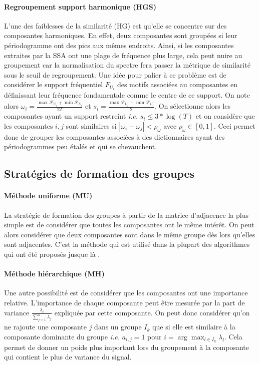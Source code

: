 \documentclass{gretsi}
\newcommand{\inter}{\left[0, 1\right]}
\begin{document}
\paragraph{Regroupement support harmonique (HGS)}\label{par:HGS}
    L'une des faiblesses de la similarité (HG) est qu'elle se concentre sur des composantes harmoniques. 
    En effet, deux composantes sont groupées si leur périodogramme ont des pics aux mêmes endroits.
    Ainsi, si les composantes extraites par la SSA ont une plage de fréquence plus large, cela peut nuire au groupement car la normalisation du spectre fera passer la métrique de similarité sous le seuil de regroupement.
    Une idée pour palier à ce problème est de considérer le support fréquentiel $F_{U_i}$ des motifs associées au composantes en définissant leur fréquence fondamentale comme le centre de ce support.
    On note alors $\omega_i = \frac{\displaystyle\max \mathcal F_{U_i} + \min \mathcal F_{U_i} }{2 T}$ et $s_i = \frac{\displaystyle\max \mathcal F_{U_i} - \min \mathcal F_{U_i} }{2}$. 
    On sélectionne alors les composantes ayant un support restreint \emph{i.e.} $s_i \le 3*\log(T)$ et on considère que les composantes $i, j$ sont similaires si $|\omega_i - \omega_j| < \rho_\omega$ avec $\rho_\omega \in \inter$.
    Ceci permet donc de grouper les composantes associées à des dictionnaires ayant des périodogrammes peu étalés et qui se chevauchent.



\subsection{Stratégies de formation des groupes}
\label{sub:clust}
\paragraph{Méthode uniforme (MU)}
    La stratégie de formation des groupes à partir de la matrice d'adjacence la plus simple est de considérer que toutes les composantes ont le même intérêt.
    On peut alors considérer que deux composantes sont dans le même groupe dès lors qu'elles sont adjacentes.
    C'est la méthode qui est utilisé dans la plupart des algorithmes qui ont été proposés jusque là \cite{abalov_14_auto, alvarez_13_auto}.\\


\paragraph{Méthode hiérarchique (MH)}
    Une autre possibilité est de considérer que les composantes ont une importance relative.
    L'importance de chaque composante peut être mesurée par la part de variance $\frac{\lambda_i}{\sum_{j=1}^n \lambda_j}$ expliquée par cette composante.
    On peut donc considérer qu'on ne rajoute une composante $j$ dans un groupe $I_k$
    que si elle est similaire à la composante dominante du groupe \emph{ i.e.} $a_{i, j} = 1$ pour $i = \arg\max_{l \in I_k} \lambda_l$.
    Cela permet de donner un poids plus important lors du groupement à la composante qui contient le plus de variance du signal.
\end{document}
